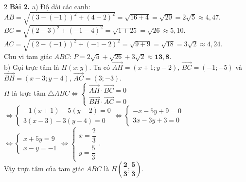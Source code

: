 \documentclass[10pt,a4paper]{article}
\begin{document}
\begin{multicols}{2}
\textbf{Bài 2.}
a) Độ dài các cạnh:\\
$AB = \sqrt{(3 - (-1))^2 + (4 - 2)^2} = \sqrt{16 + 4} = \sqrt{20} = 2\sqrt{5} \approx 4{,}47$.\\
$BC = \sqrt{(2 - 3)^2 + (-1 - 4)^2} = \sqrt{1 + 25} = \sqrt{26} \approx 5{,}10$.\\
$AC = \sqrt{(2 - (-1))^2 + (-1 - 2)^2} = \sqrt{9 + 9} = \sqrt{18} = 3\sqrt{2} \approx 4{,}24$.\\
Chu vi tam giác $ABC$: $P = 2\sqrt{5} + \sqrt{26} + 3\sqrt{2} \approx \mathbf{13{,}8}$.\\
b) Gọi trực tâm là $H(x; y)$. Ta có $\vec{AH} = (x + 1; y - 2)$, $\vec{BC} = (-1; -5)$ và $\vec{BH} = (x - 3; y - 4)$, $\vec{AC} = (3; -3)$.\\
$H$ là trực tâm $\triangle ABC \Leftrightarrow \begin{cases} \vec{AH} \cdot \vec{BC} = 0 \\ \vec{BH} \cdot \vec{AC} = 0 \end{cases}$\\
$\Leftrightarrow \begin{cases} -1(x + 1) - 5(y - 2) = 0 \\ 3(x - 3) - 3(y - 4) = 0 \end{cases} \Leftrightarrow \begin{cases} -x - 5y + 9 = 0 \\ 3x - 3y + 3 = 0 \end{cases}$\\
$\Leftrightarrow \begin{cases} x + 5y = 9 \\ x - y = -1 \end{cases} \Leftrightarrow \begin{cases} x = \dfrac{2}{3} \\ y = \dfrac{5}{3} \end{cases}$.\\
Vậy trực tâm của tam giác $ABC$ là $H\left(\mathbf{\dfrac{2}{3}}; \mathbf{\dfrac{5}{3}}\right)$.


\end{multicols}
\end{document}
